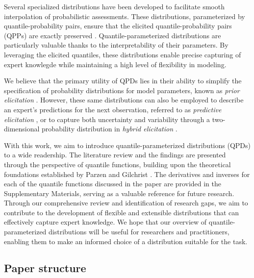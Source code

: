 \documentclass[
  fleqn,
  deca,
  blindrev
]{informs4}
\begin{document}
Several specialized distributions have been developed to facilitate
smooth interpolation of probabilistic assessments. These distributions,
parameterized by quantile-probability pairs, ensure that the elicited
quantile-probability pairs (QPPs) are exactly preserved
\citep{keelin2011QuantileParameterizedDistributions, powley2013QuantileFunctionMethods, keelin2016MetalogDistributions, hadlock2017QuantileparameterizedMethodsQuantifying, wilson2023ReconciliationExpertPriors}.
Quantile-parameterized distributions are particularly valuable thanks to
the interpretability of their parameters. By leveraging the elicited
quantiles, these distributions enable precise capturing of expert
knowlegde while maintaining a high level of flexibility in modeling.

We believe that the primary utility of QPDs lies in their ability to
simplify the specification of probability distributions for model
parameters, known as \emph{prior elicitation}
\citep{mikkola2021PriorKnowledgeElicitation}. However, these same
distributions can also be employed to describe an expert's predictions
for the next observation, referred to as \emph{predictive elicitation}
\citep{winkler1980PriorInformationPredictive, kadane1980PredictiveStructuralMethods, akbarov2009ProbabilityElicitationPredictive, hartmann2020FlexiblePriorElicitation},
or to capture both uncertainty and variability through a two-dimensional
probability distribution in \emph{hybrid elicitation}
\citep{perepolkin2021HybridElicitationIndirect}.

With this work, we aim to introduce quantile-parameterized distributions
(QPDs) to a wide readership. The literature review and the findings are
presented through the perspective of quantile functions, building upon
the theoretical foundations established by Parzen
\citep{parzen1979NonparametricStatisticalData} and Gilchrist
\citep{gilchrist2000StatisticalModellingQuantile}. The derivatives and
inverses for each of the quantile functions discussed in the paper are
provided in the Supplementary Materials, serving as a valuable reference
for future research. Through our comprehensive review and identification
of research gaps, we aim to contribute to the development of flexible
and extensible distributions that can effectively capture expert
knowledge. We hope that our overview of quantile-parameterized
distributions will be useful for researchers and practitioners, enabling
them to make an informed choice of a distribution suitable for the task.

\subsection*{Paper structure}\label{paper-structure}
\end{document}
